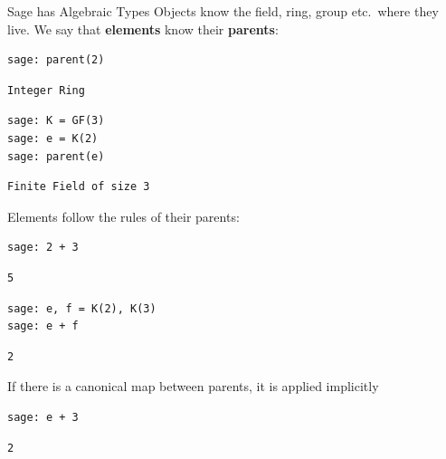 \documentclass[presentation,smaller]{beamer}
\begin{document}
\begin{frame}{Sage has Algebraic Types}
 Objects know the field, ring, group etc. where they live. We say that \textbf{elements} know their \textbf{parents}:

\lstset{language=sage,label= ,caption= ,captionpos=b,numbers=none}
\begin{lstlisting}
sage: parent(2)
\end{lstlisting}

\begin{verbatim}
Integer Ring
\end{verbatim}

\lstset{language=sage,label= ,caption= ,captionpos=b,numbers=none}
\begin{lstlisting}
sage: K = GF(3)
sage: e = K(2)
sage: parent(e)
\end{lstlisting}

\begin{verbatim}
Finite Field of size 3
\end{verbatim}

\framebreak

Elements follow the rules of their parents:

\lstset{language=sage,label= ,caption= ,captionpos=b,numbers=none}
\begin{lstlisting}
sage: 2 + 3
\end{lstlisting}

\begin{verbatim}
5
\end{verbatim}

\lstset{language=sage,label= ,caption= ,captionpos=b,numbers=none}
\begin{lstlisting}
sage: e, f = K(2), K(3)
sage: e + f
\end{lstlisting}

\begin{verbatim}
2
\end{verbatim}

\framebreak

If there is a canonical map between parents, it is applied implicitly

\lstset{language=sage,label= ,caption= ,captionpos=b,numbers=none}
\begin{lstlisting}
sage: e + 3
\end{lstlisting}

\begin{verbatim}
2
\end{verbatim}


\end{frame}
\end{document}
